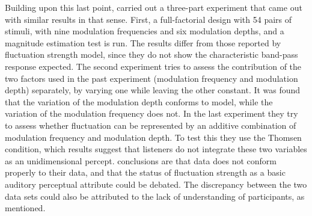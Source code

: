 \documentclass[../main.tex]{subfiles}
\begin{document}
\begin{theoreticalbackground}
Building upon this last point, \citeauthor{Wickelmaier2004Scaling} carried out
a three-part experiment that came out with similar results in that sense. First,
a full-factorial design with 54 pairs of stimuli, with nine modulation
frequencies and six modulation depths, and a magnitude estimation test is run.
The results differ from those reported by \citeauthor{Fastl2007Psychoacoustics}
fluctuation strength model, since they do not show the characteristic band-pass
response expected. The second experiment tries to assess the contribution of the
two factors used in the past experiment (modulation frequency and modulation
depth) separately, by varying one while leaving the other constant. It was found
that the variation of the modulation depth conforms to
\citeauthor{Fastl2007Psychoacoustics} model, while the variation of the
modulation frequency does not. In the last experiment they try to assess whether
fluctuation can be represented by an additive combination of modulation
frequency and modulation depth. To test this they use the Thomsen condition,
which results suggest that listeners do not integrate these two variables as an
unidimensional percept. \citeauthor{Wickelmaier2004Scaling} conclusions are that
\citeauthor{Fastl2007Psychoacoustics} data does not conform properly to their
data, and that the status of fluctuation strength as a basic auditory perceptual
attribute could be debated. The discrepancy between the two data sets could also
be attributed to the lack of understanding of participants, as
\citeauthor{Accolti2009Fluctuation} mentioned.

\end{theoreticalbackground}
\end{document}
